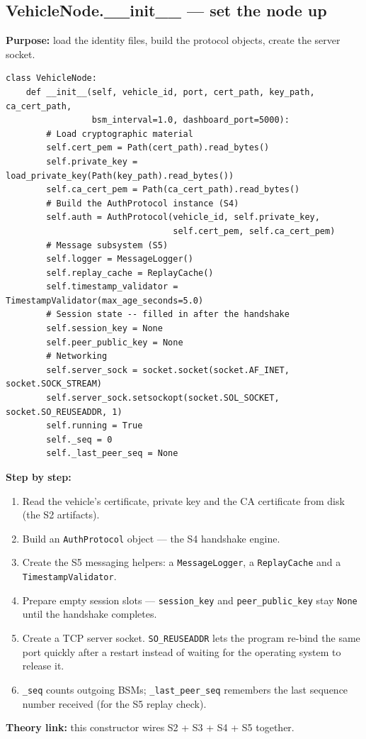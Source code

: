 \documentclass[11pt,a4paper]{article}
\begin{document}
\subsection{VehicleNode.\_\_init\_\_ --- set the node up}
\textbf{Purpose:} load the identity files, build the protocol objects, create the
server socket.
\begin{lstlisting}[style=py,caption={vehicle\_node.py --- the VehicleNode constructor (key parts).}]
class VehicleNode:
    def __init__(self, vehicle_id, port, cert_path, key_path, ca_cert_path,
                 bsm_interval=1.0, dashboard_port=5000):
        # Load cryptographic material
        self.cert_pem = Path(cert_path).read_bytes()
        self.private_key = load_private_key(Path(key_path).read_bytes())
        self.ca_cert_pem = Path(ca_cert_path).read_bytes()
        # Build the AuthProtocol instance (S4)
        self.auth = AuthProtocol(vehicle_id, self.private_key,
                                 self.cert_pem, self.ca_cert_pem)
        # Message subsystem (S5)
        self.logger = MessageLogger()
        self.replay_cache = ReplayCache()
        self.timestamp_validator = TimestampValidator(max_age_seconds=5.0)
        # Session state -- filled in after the handshake
        self.session_key = None
        self.peer_public_key = None
        # Networking
        self.server_sock = socket.socket(socket.AF_INET, socket.SOCK_STREAM)
        self.server_sock.setsockopt(socket.SOL_SOCKET, socket.SO_REUSEADDR, 1)
        self.running = True
        self._seq = 0
        self._last_peer_seq = None
\end{lstlisting}
\textbf{Step by step:}
\begin{enumerate}
  \item Read the vehicle's certificate, private key and the CA certificate from
        disk (the S2 artifacts).
  \item Build an \texttt{AuthProtocol} object --- the S4 handshake engine.
  \item Create the S5 messaging helpers: a \texttt{MessageLogger}, a
        \texttt{ReplayCache} and a \texttt{TimestampValidator}.
  \item Prepare empty session slots --- \texttt{session\_key} and
        \texttt{peer\_public\_key} stay \texttt{None} until the handshake
        completes.
  \item Create a TCP server socket. \texttt{SO\_REUSEADDR} lets the program
        re-bind the same port quickly after a restart instead of waiting for the
        operating system to release it.
  \item \texttt{\_seq} counts outgoing BSMs; \texttt{\_last\_peer\_seq} remembers
        the last sequence number received (for the S5 replay check).
\end{enumerate}
\textbf{Theory link:} this constructor wires S2 + S3 + S4 + S5 together.
\end{document}
